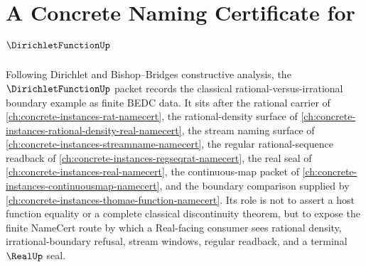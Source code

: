 \chapter{A Concrete Naming Certificate for $\DirichletFunctionUp$}
\label{ch:concrete-instances-dirichlet-function-namecert}

Following Dirichlet and Bishop--Bridges constructive analysis, the $\DirichletFunctionUp$ packet records the classical rational-versus-irrational boundary example as finite BEDC data. It sits after the rational carrier of \autoref{ch:concrete-instances-rat-namecert}, the rational-density surface of \autoref{ch:concrete-instances-rational-density-real-namecert}, the stream naming surface of \autoref{ch:concrete-instances-streamname-namecert}, the regular rational-sequence readback of \autoref{ch:concrete-instances-regseqrat-namecert}, the real seal of \autoref{ch:concrete-instances-real-namecert}, the continuous-map packet of \autoref{ch:concrete-instances-continuousmap-namecert}, and the boundary comparison supplied by \autoref{ch:concrete-instances-thomae-function-namecert}. Its role is not to assert a host function equality or a complete classical discontinuity theorem, but to expose the finite NameCert route by which a Real-facing consumer sees rational density, irrational-boundary refusal, stream windows, regular readback, and a terminal $\RealUp$ seal.



